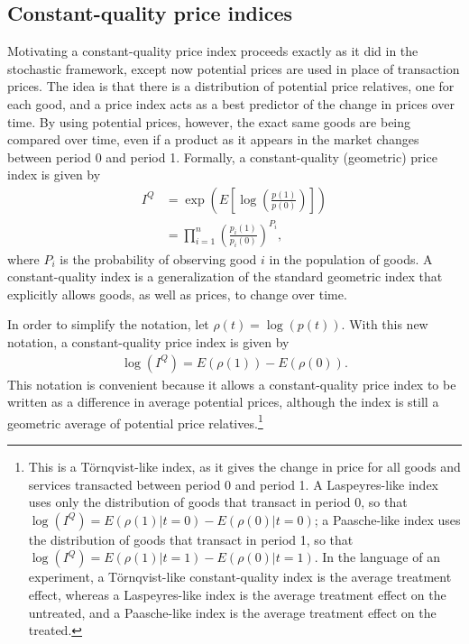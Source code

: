 \documentclass[]{article}
\begin{document}
\hypertarget{constant-quality-price-indices}{%
\subsection{Constant-quality price indices}\label{constant-quality-price-indices}}

Motivating a constant-quality price index proceeds exactly as it did in the stochastic framework, except now potential prices are used in place of transaction prices. The idea is that there is a distribution of potential price relatives, one for each good, and a price index acts as a best predictor of the change in prices over time. By using potential prices, however, the exact same goods are being compared over time, even if a product as it appears in the market changes between period 0 and period 1. Formally, a constant-quality (geometric) price index is given by
\begin{align*}
I^{Q} &= \exp\left(E\left[\log\left(\frac{p(1)}{p(0)}\right)\right]\right) \\
&= \prod_{i = 1}^{n} \left(\frac{p_{i}(1)}{p_{i}(0)}\right)^{P_{i}},
\end{align*}
where \(P_{i}\) is the probability of observing good \(i\) in the population of goods. A constant-quality index is a generalization of the standard geometric index that explicitly allows goods, as well as prices, to change over time.

In order to simplify the notation, let \(\rho(t) = \log(p(t))\). With this new notation, a constant-quality price index is given by
\begin{align*}
\log(I^{Q}) = E(\rho(1)) - E(\rho(0)).
\end{align*}
This notation is convenient because it allows a constant-quality price index to be written as a difference in average potential prices, although the index is still a geometric average of potential price relatives.\footnote{This is a Törnqvist-like index, as it gives the change in price for all goods and services transacted between period 0 and period 1. A Laspeyres-like index uses only the distribution of goods that transact in period 0, so that \(\log(I^{Q}) = E(\rho(1) | t = 0) - E(\rho(0) | t = 0)\); a Paasche-like index uses the distribution of goods that transact in period 1, so that \(\log(I^{Q}) = E(\rho(1) | t = 1) - E(\rho(0) | t = 1)\). In the language of an experiment, a Törnqvist-like constant-quality index is the average treatment effect, whereas a Laspeyres-like index is the average treatment effect on the untreated, and a Paasche-like index is the average treatment effect on the treated.}
\end{document}
